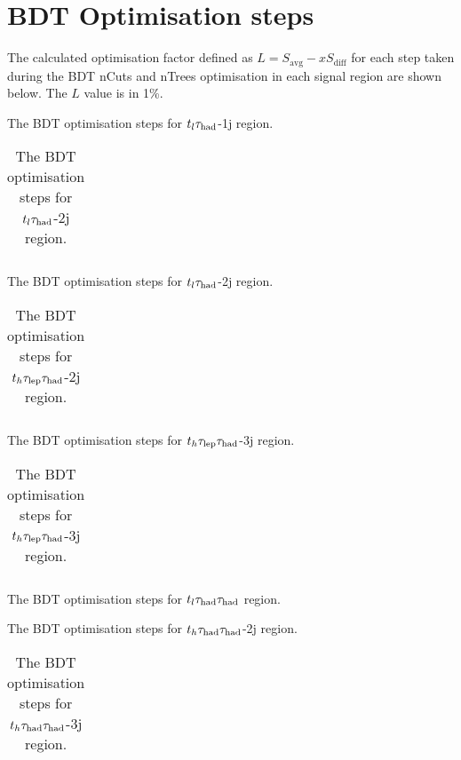 \section{BDT Optimisation steps}
\label{sec:BDTOptim}

The calculated optimisation factor defined as $L=S_\mathrm{avg}-xS_\mathrm{diff}$ for each step taken during the BDT nCuts and nTrees optimisation in each signal region are shown below. The $L$ value is in 1\%.

\begin{table}[H]
\caption{The BDT optimisation steps for $t_l\tau_\text{had}$-1j region.}

\end{table}
\begin{longtable}{|c|c|c|c|c|c|}
\caption{The BDT optimisation steps for $t_l\tau_\text{had}$-2j region.}\\\hline

\end{longtable}
\begin{table}[H]
\caption{The BDT optimisation steps for $t_l\tau_\text{had}$-2j region.}

\end{table}
\begin{longtable}{|c|c|c|c|c|c|}
\caption{The BDT optimisation steps for $t_h\tau_\text{lep}{}\tau_\text{had}$-2j region.}\\\hline

\end{longtable}
\begin{table}[H]
\caption{The BDT optimisation steps for $t_h\tau_\text{lep}{}\tau_\text{had}$-3j region.}

\end{table}
\begin{longtable}{|c|c|c|c|c|c|c|}
\caption{The BDT optimisation steps for $t_h\tau_\text{lep}{}\tau_\text{had}$-3j region.}\\\hline

\end{longtable}
\begin{table}[H]
\caption{The BDT optimisation steps for $t_l\tau_\text{had}{}\tau_\text{had}$ region.}

\end{table}
\begin{table}[H]
\caption{The BDT optimisation steps for $t_h\tau_\text{had}{}\tau_\text{had}$-2j region.}

\end{table}
\begin{longtable}{|c|c|c|c|c|c|c|}
\caption{The BDT optimisation steps for $t_h\tau_\text{had}{}\tau_\text{had}$-3j region.}\\\hline

\end{longtable}